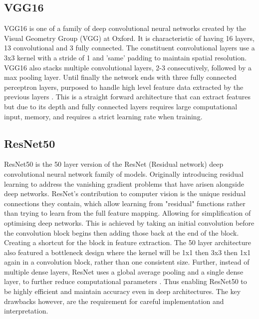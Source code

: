 \documentclass[10pt,twocolumn,letterpaper]{article}
\begin{document}
\subsection{VGG16}
VGG16 is one of a family of deep convolutional neural networks created by the Visual Geometry Group (VGG) at Oxford. It is characteristic of having 16 layers, 13 convolutional and 3 fully connected. The constituent convolutional layers use a 3x3 kernel with a stride of 1 and 'same' padding to maintain spatial resolution. VGG16 also stacks multiple convolutional layers, 2-3 consecutively, followed by a max pooling layer. Until finally the network ends with three fully connected perceptron layers, purposed to handle high level feature data extracted by the previous layers \cite{original_vgg}. This is a straight forward architecture that can extract features but due to its depth and fully connected layers requires large computational input, memory, and requires a strict learning rate when training. 

\subsection{ResNet50}
ResNet50 is the 50 layer version of the ResNet (Residual network) deep convolutional neural network family of models. Originally introducing residual learning to address the vanishing gradient problems that have arisen alongside deep networks. ResNet's contribution to computer vision is the unique residual connections they contain, which allow learning from "residual" functions rather than trying to learn from the full feature mapping. Allowing for simplification of optimising deep networks. This is achieved by taking an initial convolution before the convolution block begins then adding those back at the end of the block. Creating a shortcut for the block in feature extraction. The 50 layer architecture also featured a bottleneck design where the kernel will be 1x1 then 3x3 then 1x1 again in a convolution block, rather than one consistent size. Further, instead of multiple dense layers, ResNet uses a global average pooling and a single dense layer, to further reduce computational parameters \cite{original_resnet} \cite{finetuningresnet50}. Thus enabling ResNet50 to be highly efficient and maintain accuracy even in deep architectures. The key drawbacks however, are the requirement for careful implementation and interpretation. 
\end{document}

